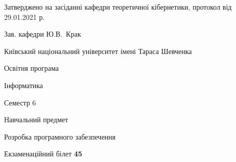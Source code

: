 \documentclass[10pt, ukrainian]{article}
\begin{document}
{\vspace{5mm}\smallskip \begin {small} Затверджено на засіданні кафедри теоретичної кібернетики, протокол  від   29.01.2021 р.\par\smallskip\smallskip
{\parbox {6.5 cm}{Зав. кафедри \dotfill Ю.В.~Крак}} \end{small}}
\newpage

{{\begin {small}\par
{ \center  Київський національний університет імені Тараса Шевченка \par}
{\parbox {5 cm}{Освітня програма \hfill}{\parbox {7 cm}{Інформатика \hfill}}\parbox {6 cm}{\hfill Семестр 6}}\par
{\parbox {5 cm} {Навчальний предмет \hfill}\parbox {7 cm}{Розробка програмного забезпечення \hfill}\parbox {6cm}{\hfill}\par}\vspace{-7pt} \end{small}}{\center Екзаменаційний білет \No \textbf
{ 45 }\par}}
\end{document}
